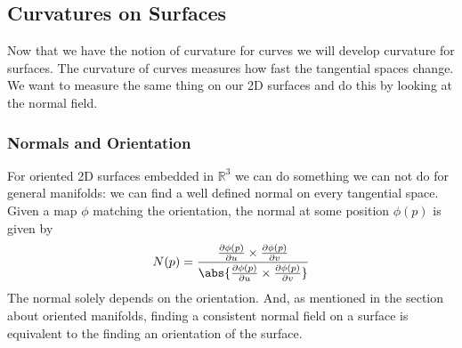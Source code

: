 \subsection{Curvatures on Surfaces}
Now that we have the notion of curvature for curves we will develop curvature for surfaces. The curvature of curves measures how fast the tangential spaces change. We want to measure the same thing on our 2D surfaces and do this by looking at the normal field.

\subsubsection{Normals and Orientation}
For oriented 2D surfaces embedded in $\mathbb R^3$ we can do something we can not do for general manifolds: we can find a well defined normal on every tangential space. Given a map $\phi$ matching the orientation, the normal at some position $\phi(p)$ is given by
\[N(p) = \frac{\frac{\partial \phi(p)} {\partial u} \times \frac{\partial \phi(p)} {\partial v}}{\abs{\frac{\partial \phi(p)} {\partial u} \times \frac{\partial \phi(p)} {\partial v}}}\]
The normal solely depends on the orientation. And, as mentioned in the section about oriented manifolds, finding a consistent normal field on a surface is equivalent to the finding an orientation of the surface.


